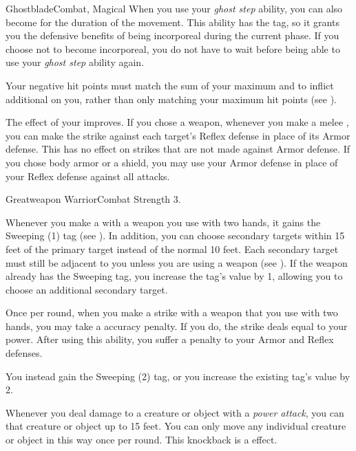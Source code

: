\begin{magicalfeat}{Ghostblade}{Combat, Magical}
     When you use your \textit{ghost step} ability, you can also become  for the duration of the movement.
    This ability has the  tag, so it grants you the defensive benefits of being incorporeal during the current phase.
    If you choose not to become incorporeal, you do not have to wait  before being able to use your \textit{ghost step} ability again.

     Your negative hit points must match the sum of your maximum  and  to inflict additional  on you, rather than only matching your maximum hit points (see ).

     The effect of your  improves.
    If you chose a weapon, whenever you make a melee , you can make the strike against each target's Reflex defense in place of its Armor defense.
    This has no effect on strikes that are not made against Armor defense.
    If you chose body armor or a shield, you may use your Armor defense in place of your Reflex defense against all attacks.
  \end{magicalfeat}

  \begin{feat}{Greatweapon Warrior}{Combat}
    \featpre Strength 3.

     Whenever you make a   with a weapon you use with two hands, it gains the Sweeping (1) tag (see ).
    In addition, you can choose secondary targets within 15 feet of the primary target instead of the normal 10 feet.
    Each secondary target must still be adjacent to you unless you are using a  weapon (see ).
    If the weapon already has the Sweeping tag, you increase the tag's value by 1, allowing you to choose an additional secondary target.

     Once per round, when you make a  strike with a weapon that you use with two hands, you may take a  accuracy penalty.
    If you do, the strike deals  equal to your power.
    After using this ability, you  suffer a  penalty to your Armor and Reflex defenses.

     You instead gain the Sweeping (2) tag, or you increase the existing tag's value by 2.

     Whenever you deal damage to a creature or object with a \textit{power attack}, you can  that creature or object up to 15 feet.
    You can only move any individual creature or object in this way once per round.
    This knockback is a \atSizeBased effect.
  \end{feat}

